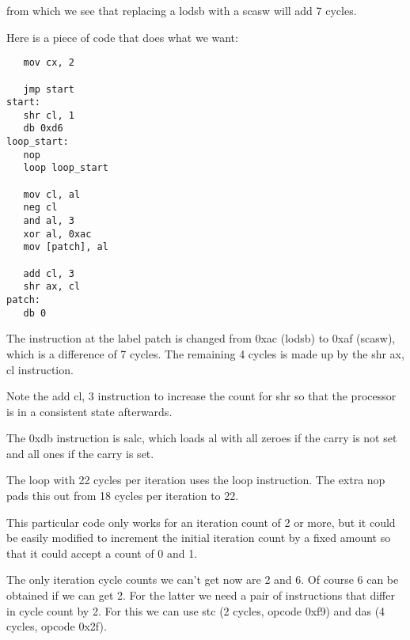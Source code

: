 \documentclass[a4paper,10pt]{amsart}
\begin{document}
from which we see that replacing a lodsb with a scasw will add 7 cycles.

Here is a piece of code that does what we want:

\begin{lstlisting}
   mov cx, 2

   jmp start
start:
   shr cl, 1
   db 0xd6
loop_start:
   nop
   loop loop_start

   mov cl, al
   neg cl
   and al, 3
   xor al, 0xac
   mov [patch], al

   add cl, 3
   shr ax, cl
patch:
   db 0
\end{lstlisting}

The instruction at the label patch is changed from $0$xac (lodsb) to $0$xaf
(scasw), which is a difference of 7 cycles. The remaining 4 cycles is made up
by the shr ax, cl instruction.

Note the add cl, 3 instruction to increase the count for shr so that the processor
is in a consistent state afterwards.

The $0$xdb instruction is salc, which loads al with all zeroes if the carry is
not set and all ones if the carry is set.

The loop with 22 cycles per iteration uses the loop instruction. The extra nop
pads this out from 18 cycles per iteration to 22.

This particular code only works for an iteration count of 2 or more, but it
could be easily modified to increment the initial iteration count by a fixed
amount so that it could accept a count of 0 and 1.

The only iteration cycle counts we can't get now are 2 and 6. Of course 6 can
be obtained if we can get 2. For the latter we need a pair of instructions that
differ in cycle count by 2. For this we can use stc (2 cycles, opcode $0$xf9)
and das (4 cycles, opcode $0$x2f).
\end{document}
